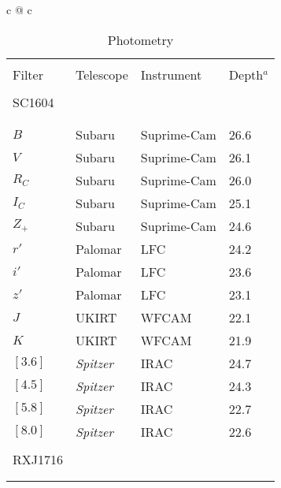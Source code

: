 \documentclass[a4paper,fleqn,usenatbib]{mnras}
\begin{document}
\begin{table*}
	\begin{center}
	\caption{Photometry}
	\label{tab:photometry}

	{\vskip 1mm}
	\begin{tabular}{c @{\hskip 15mm} c}

		\begin{tabular}{llll}

		\hline \\[-3.3mm]  

		Filter & Telescope & Instrument & Depth$^a$ \\[0mm]

		\hline \\[-3mm]  
		SC1604 \\[-1mm]
		\hline \\[-5mm]  
		\hline \\[-2mm]

		$B$    &   Subaru   &   Suprime-Cam   &   26.6   \\
		$V$    &   Subaru   &   Suprime-Cam   &   26.1   \\
		$R_C$  &   Subaru   &   Suprime-Cam   &   26.0   \\
		$I_C$  &   Subaru   &   Suprime-Cam   &   25.1   \\
		$Z_+$  &   Subaru   &   Suprime-Cam   &   24.6   \\
		$r'$   &   Palomar   &   LFC   &   24.2   \\
		$i'$   &   Palomar   &   LFC   &   23.6   \\
		$z'$   &   Palomar   &   LFC   &   23.1   \\
		$J$   &   UKIRT   &   WFCAM   &   22.1   \\
		$K$   &   UKIRT   &   WFCAM   &   21.9   \\
		$[3.6]$  &   {\it Spitzer}  &   IRAC   &   24.7   \\
		$[4.5]$  &   {\it Spitzer}  &   IRAC   &   24.3   \\
		$[5.8]$  &   {\it Spitzer}  &   IRAC   &   22.7   \\
		$[8.0]$  &   {\it Spitzer}  &   IRAC   &   22.6   \\[1mm]



		\hline \\[-3mm]
		RXJ1716 \\[-1mm]
		\hline \\[-5mm]  
		\hline \\[-2mm]


\end{tabular}
\end{tabular}
\end{center}
\end{table*}
\end{document}
